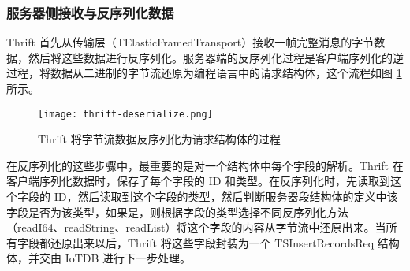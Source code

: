 \subsubsection{服务器侧接收与反序列化数据}
Thrift 首先从传输层（TElasticFramedTransport）接收一帧完整消息的字节数据，然后将这些数据进行反序列化。服务器端的反序列化过程是客户端序列化的逆过程，将数据从二进制的字节流还原为编程语言中的请求结构体，这个流程如图 \ref{fig:thrift-deserialize} 所示。
\begin{figure}
  \centering
  \texttt{[image: thrift-deserialize.png]}
  \caption{Thrift 将字节流数据反序列化为请求结构体的过程}
  \label{fig:thrift-deserialize}
\end{figure}

在反序列化的这些步骤中，最重要的是对一个结构体中每个字段的解析。Thrift 在客户端序列化数据时，保存了每个字段的 ID 和类型。在反序列化时，先读取到这个字段的 ID，然后读取到这个字段的类型，然后判断服务器段结构体的定义中该字段是否为该类型，如果是，则根据字段的类型选择不同反序列化方法（readI64、readString、readList）将这个字段的内容从字节流中还原出来。当所有字段都还原出来以后，Thrift 将这些字段封装为一个 TSInsertRecordsReq 结构体，并交由 IoTDB 进行下一步处理。
